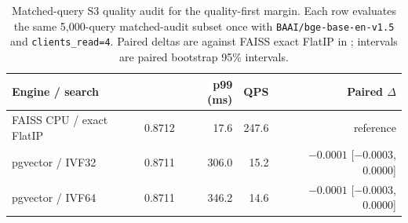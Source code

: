 \begin{table}[t]
\centering
\footnotesize
\setlength{\tabcolsep}{3pt}
\caption{Matched-query S3 quality audit for the quality-first margin. Each row evaluates the same 5{,}000-query \hotpotmaxionbench{} matched-audit subset once with \texttt{BAAI/bge-base-en-v1.5} and \texttt{clients\_read=4}. Paired deltas are against FAISS exact FlatIP in \ecov{}; intervals are paired bootstrap 95\% intervals.}
\label{tab:s3-paired-quality}
\begin{tabular}{lrrrr}
\toprule
Engine / search & \ecov{} & p99 (ms) & QPS & Paired $\Delta$ \ecov{} \\
\midrule
FAISS CPU / exact FlatIP & 0.8712 & 17.6 & 247.6 & reference \\
pgvector / IVF32 & 0.8711 & 306.0 & 15.2 & $-0.0001$ [$-0.0003$, 0.0000] \\
pgvector / IVF64 & 0.8711 & 346.2 & 14.6 & $-0.0001$ [$-0.0003$, 0.0000] \\
\bottomrule
\end{tabular}
\end{table}
